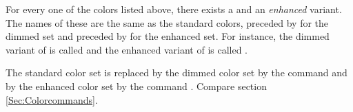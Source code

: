   \newslide

  For every one of the colors listed above, there exists a  and an \emph{enhanced} variant. The names of
  these are the same as the standard colors, preceded by  for the dimmed set and preceded by  for the
  enhanced set. For instance, the dimmed variant of  is called  and the enhanced
  variant of  is called .
  
  The standard color set is replaced by the dimmed color set by the command  and by the enhanced
  color set by the command . Compare section \ref{Sec:Colorcommands}.

{%
  \newslide

  \whitebackground\pagecolor{pagecolor}\color{textcolor}


}
